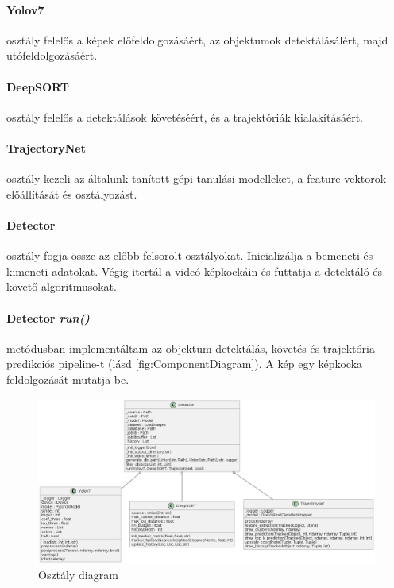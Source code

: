 \documentclass[12pt,a4paper]{article}
\begin{document}
\paragraph{Yolov7} osztály felelős a képek előfeldolgozásáért, az objektumok detektálásálért, majd utófeldolgozásáért.
\paragraph{DeepSORT} osztály felelős a detektálások követéséért, és a trajektóriák kialakításáért.
\paragraph{TrajectoryNet} osztály kezeli az általunk tanított gépi tanulási modelleket, a feature vektorok előállítását és osztályozást.
\paragraph{Detector} osztály fogja össze az előbb felsorolt osztályokat. Inicializálja a bemeneti és kimeneti adatokat. Végig itertál a videó képkockáin és futtatja a detektáló és követő algoritmusokat.
\paragraph{Detector \textit{run()}} metódusban implementáltam az objektum detektálás, követés és trajektória predikciós pipeline-t (lásd \ref{fig:ComponentDiagram}). A kép egy képkocka feldolgozását mutatja be.

\begin{figure}[H]
    \includegraphics[width=1\columnwidth]{ClassArchitectureDiagram.png}
    \caption{Osztály diagram}
    \label{fig:ClassDiagram}
\end{figure}
\end{document}
